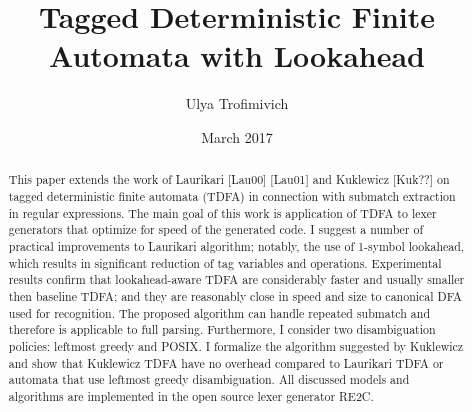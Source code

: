 \documentclass{article}
\title{Tagged Deterministic Finite Automata with Lookahead}
\author{Ulya Trofimivich}
\date{March 2017}
\theoremstyle{definition}
\begin{document}
\maketitle

\begin{abstract}
\noindent
This paper extends the work of Laurikari [Lau00] [Lau01] and Kuklewicz [Kuk??] on tagged deterministic finite automata (TDFA)
in connection with submatch extraction in regular expressions.
The main goal of this work is application of TDFA to lexer generators that optimize for speed of the generated code.
I suggest a number of practical improvements to Laurikari algorithm;
notably, the use of 1-symbol lookahead, which results in significant reduction of tag variables and operations.
Experimental results confirm that lookahead-aware TDFA are considerably faster and usually smaller then baseline TDFA;
and they are reasonably close in speed and size to canonical DFA used for recognition.
The proposed algorithm can handle repeated submatch and therefore is applicable to full parsing.
Furthermore, I consider two disambiguation policies: leftmost greedy and POSIX.
I formalize the algorithm suggested by Kuklewicz
and show that Kuklewicz TDFA have no overhead compared to Laurikari TDFA or automata that use leftmost greedy disambiguation.
All discussed models and algorithms are implemented in the open source lexer generator RE2C.
\end{abstract}
\end{document}
